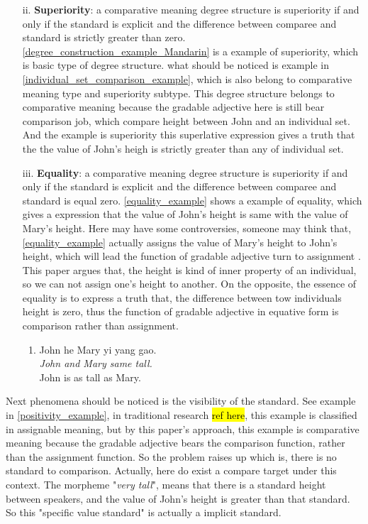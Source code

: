 \documentclass{ctexart}
\let \cite \parencite
\begin{document}
\begin{itemize}
\begin{itemize}
        \item[ii.] \textbf{Superiority}: a comparative meaning degree structure is superiority if and only if the standard is explicit and the difference between comparee and standard is strictly greater than zero. \ref{degree_construction_example_Mandarin} is a example of superiority, which is basic type of degree structure. what should be noticed is example in \ref{individual_set_comparison_example}, which is also belong to comparative meaning type and superiority subtype. This degree structure belongs to comparative meaning because the gradable adjective here is still bear comparison job, which compare height between John and an individual set. And the example is superiority this superlative expression gives a truth that the the value of John's heigh is strictly greater than any of individual set.
        
        \item[iii.] \textbf{Equality}: a comparative meaning degree structure is superiority if and only if the standard is explicit and the difference between comparee and standard is equal zero. \ref{equality_example} shows a example of equality, which gives a expression that the value of John's height is same with the value of Mary's height. Here may have some controversies, someone may think that, \ref{equality_example} actually assigns the value of Mary's height to John's height, which will lead the function of gradable adjective turn to assignment \cite{guo2012}. This paper argues that, the height is kind of inner property of an individual, so we can not assign one's height to another. On the opposite, the essence of equality is to express a truth that, the difference between tow individuals height is zero, thus the function of gradable adjective in equative form is comparison rather than assignment.
        
        \begin{enumerate}[resume]
            \item \label{equality_example}
            John he Mary yi yang gao.\\
            \textit{John and Mary same tall.}\\
            John is as tall as Mary.
        \end{enumerate}

    \end{itemize}   

\end{itemize}

Next phenomena should be noticed is the visibility of the standard. See example in \ref{positivity_example}, in traditional research \hl{ref here}, this example is classified in assignable meaning, but by this paper's approach, this example is comparative meaning because the gradable adjective bears the comparison function, rather than the assignment function. So the problem raises up which is, there is no standard to comparison. Actually, here do exist a compare target under this context. The morpheme "\textit{very tall}", means that there is a standard height between speakers, and the value of John's height is greater than that standard. So this "specific value standard" is actually a implicit standard.
\end{document}

